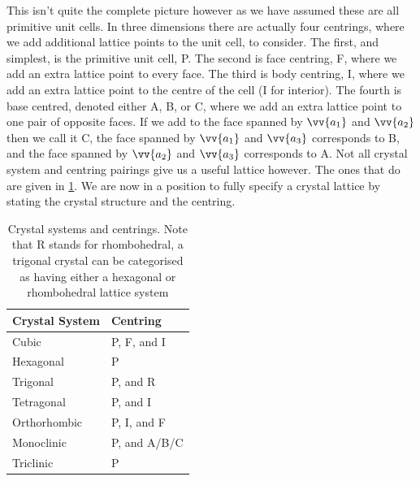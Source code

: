 \documentclass[fleqn]{NotesClass}
\begin{document}
    This isn't quite the complete picture however as we have assumed these are all primitive unit cells.
    In three dimensions there are actually four centrings, where we add additional lattice points to the unit cell, to consider.
    The first, and simplest, is the primitive unit cell, P.
    The second is face centring, F, where we add an extra lattice point to every face.
    The third is body centring, I, where we add an extra lattice point to the centre of the cell (I for interior).
    The fourth is base centred, denoted either A, B, or C, where we add an extra lattice point to one pair of opposite faces.
    If we add to the face spanned by \(\vv{a_1}\) and \(\vv{a_2}\) then we call it C, the face spanned by \(\vv{a_1}\) and \(\vv{a_3}\) corresponds to B, and the face spanned by \(\vv{a_2}\) and \(\vv{a_3}\) corresponds to A.
    Not all crystal system and centring pairings give us a useful lattice however.
    The ones that do are given in \cref{tab:crystal system centring}.
    We are now in a position to fully specify a crystal lattice by stating the crystal structure and the centring.
    \begin{table}
        \caption{Crystal systems and centrings. Note that R stands for rhombohedral, a trigonal crystal can be categorised as having either a hexagonal or rhombohedral lattice system}
        \label{tab:crystal system centring}
        \begin{tabular}{ll}\toprule
            Crystal System & Centring\\\midrule
            Cubic & P, F, and I\\
            Hexagonal & P\\
            Trigonal & P, and R\\
            Tetragonal & P, and I\\
            Orthorhombic & P, I, and F\\
            Monoclinic & P, and A/B/C\\
            Triclinic & P\\\bottomrule
        \end{tabular}
    \end{table}
\end{document}
